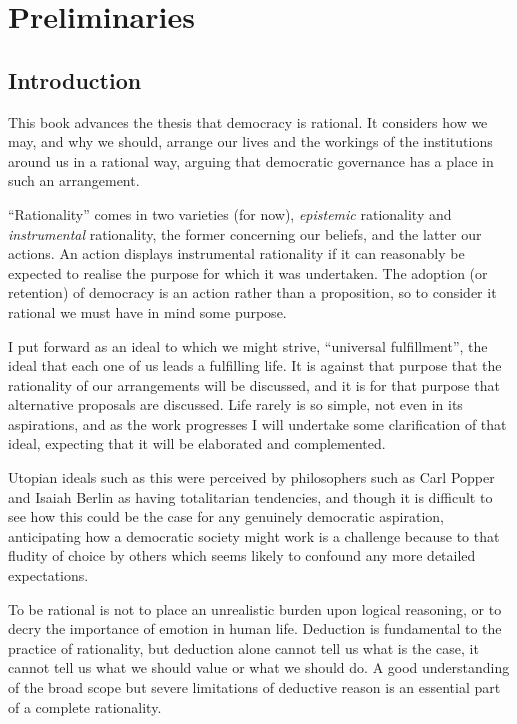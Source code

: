 \mainmatter
\part{Preliminaries}
\chapter{Introduction}

This book advances the thesis that democracy is rational.
It considers how we may, and why we should, arrange our lives and the workings of the institutions around us in a rational way, arguing that democratic governance has a place in such an arrangement.

``Rationality'' comes in two varieties (for now), \emph{epistemic} rationality and \emph{instrumental} rationality, the former concerning our beliefs, and the latter our actions.
An action displays instrumental rationality if it can reasonably be expected to realise the purpose for which it was undertaken.
The adoption (or retention) of democracy is an action rather than a  proposition, so to consider it rational we must have in mind some purpose.

I put forward as an ideal to which we might strive, ``universal fulfillment'', the ideal that each one of us leads a fulfilling life.
It is against that purpose that the rationality of our arrangements will be discussed, and it is for that purpose that alternative proposals are discussed.
Life rarely is so simple, not even in its aspirations, and as the work progresses I will undertake some clarification of that ideal, expecting that it will be elaborated and complemented.

Utopian ideals such as this were perceived by philosophers such as Carl Popper \cite{PopperPOH} and Isaiah Berlin as having totalitarian tendencies, and though it is difficult to see how this could be the case for any genuinely democratic aspiration, anticipating how a democratic society might work is a challenge because to that fludity of choice by others which seems likely to confound any more detailed expectations.

To be rational is not to place an unrealistic burden upon logical reasoning, or to decry the importance of emotion in human life.
Deduction is fundamental to the practice of rationality, but deduction alone cannot tell us what is the case, it cannot tell us what we should value or what we should do.
A good understanding of the broad scope but severe limitations of deductive reason is an essential part of a complete rationality.

